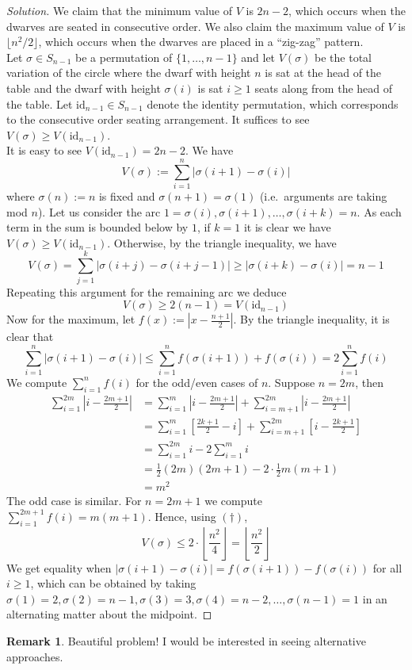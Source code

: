 \documentclass[11pt]{article}
\theoremstyle{definition}
\newtheorem*{remark}{Remark}
\begin{document}
\begin{proof}[Solution]
  We claim that the minimum value of $V$ is $2n-2$, which occurs when the dwarves are seated in consecutive order. 
  We also claim the maximum value of $V$ is $\lfloor n^2 / 2 \rfloor$, which occurs when the dwarves are placed in a 
  ``zig-zag'' pattern. \\ 

  Let $\sigma \in S_{n-1}$ be a permutation of $\{1, \dots, n-1\}$ and let $V(\sigma)$ be the total variation of 
  the circle where the dwarf with height $n$ is sat at the head of the table and the dwarf with height $\sigma(i)$ 
  is sat $i \geq 1$ seats along from the head of the table. Let $\text{id}_{n-1} \in S_{n-1}$ denote the identity 
  permutation, which corresponds to the consecutive order seating arrangement. It suffices to see $V(\sigma) \geq 
  V(\text{id}_{n-1})$. \\ 

  It is easy to see $V(\text{id}_{n-1}) = 2n-2$. We have \[V(\sigma) := \sum_{i=1}^{n} |\sigma(i+1) - \sigma(i)|\]
  where $\sigma(n) := n$ is fixed and $\sigma(n+1) = \sigma(1)$ (i.e.~arguments are taking mod $n$). Let us consider 
  the arc $1 = \sigma(i), \sigma(i + 1), \dots, \sigma(i + k) = n$. As each term in the sum is bounded below by $1$, 
  if $k = 1$ it is clear we have $V(\sigma) \geq V(\text{id}_{n-1})$. Otherwise, by the triangle inequality, we have 
  \[V(\sigma) = \sum_{j = 1}^{k} |\sigma(i + j) - \sigma(i + j - 1)| \geq |\sigma(i + k) - \sigma(i)| = n-1\]
  Repeating this argument for the remaining arc we deduce 
  \[V(\sigma) \geq 2(n-1) = V(\text{id}_{n-1})\]
  Now for the maximum, let $f(x) := \left|x - \frac{n+1}{2}\right|$. By the triangle inequality, it is clear that 
  \[\sum_{i=1}^n |\sigma(i+1) - \sigma(i)| \leq \sum_{i=1}^n f(\sigma(i+1)) + f(\sigma(i)) = 2\sum_{i=1}^n f(i) \tag{$(\dagger)$}\]
  We compute $\sum_{i=1}^n f(i)$ for the odd/even cases of $n$. Suppose $n = 2m$, then 
  \begin{align*}
    \sum_{i=1}^{2m} \left|i - \frac{2m+1}{2}\right| &= \sum_{i=1}^m \left|i - \frac{2m+1}{2}\right| 
    + \sum_{i=m+1}^{2m} \left|i - \frac{2m+1}{2}\right| \\ &= \sum_{i=1}^m \left[\frac{2k+1}{2} - i\right] + 
    \sum_{i = m+1}^{2m} \left[i - \frac{2k+1}{2}\right] \\ &= \sum_{i=1}^{2m} i - 2\sum_{i=1}^m i \\
    &= \frac{1}{2}(2m)(2m+1) - 2 \cdot \frac{1}{2}m(m+1) \\ &= m^2
  \end{align*}
  The odd case is similar. For $n = 2m+1$ we compute $\sum_{i=1}^{2m+1} f(i) = m(m+1)$. Hence, using $(\dagger)$, 
  \[V(\sigma) \leq 2 \cdot \left\lfloor \frac{n^2}{4} \right\rfloor = \left\lfloor \frac{n^2}{2} \right\rfloor\]
  We get equality when $|\sigma(i+1) - \sigma(i)| = f(\sigma(i+1)) - f(\sigma(i))$ for all $i \geq 1$, which 
  can be obtained by taking $\sigma(1) = 2, \sigma(2) = n-1, \sigma(3) = 3, \sigma(4) = n-2, \dots, \sigma(n-1) = 1$ 
  in an alternating matter about the midpoint.
\end{proof}

\begin{remark}
  Beautiful problem! I would be interested in seeing alternative approaches.
\end{remark}
\end{document}
